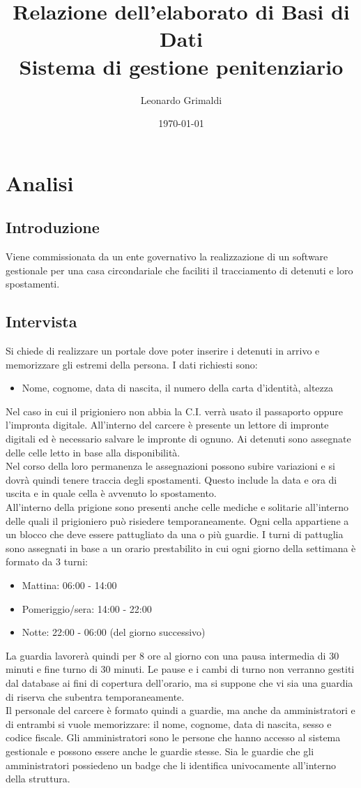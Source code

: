 \documentclass[a4paper,12pt]{report}
\title{Relazione dell'elaborato di Basi di Dati
    \\ Sistema di gestione penitenziario}
\author{Leonardo Grimaldi}
\date{\today}
\begin{document}
\maketitle
\tableofcontents
\chapter{Analisi}
\section{Introduzione}
Viene commissionata da un ente governativo la realizzazione di un software gestionale per una casa circondariale che faciliti il tracciamento di detenuti e loro spostamenti.
\section{Intervista}
Si chiede di realizzare un portale dove poter inserire i detenuti in arrivo e memorizzare gli estremi della persona.
%
I dati richiesti sono:
\begin{itemize}
    \item Nome, cognome, data di nascita, il numero della carta d'identità, altezza
\end{itemize}
Nel caso in cui il prigioniero non abbia la C.I. verrà usato il passaporto oppure l'impronta digitale.
%
All'interno del carcere è presente un lettore di impronte digitali ed è necessario salvare le impronte di ognuno.
%
Ai detenuti sono assegnate delle celle letto in base alla disponibilità.
%
\\Nel corso della loro permanenza le assegnazioni possono subire variazioni e si dovrà quindi tenere traccia degli spostamenti.
%
Questo include la data e ora di uscita e in quale cella è avvenuto lo spostamento.
%
\\All'interno della prigione sono presenti anche celle mediche e solitarie all'interno delle quali il prigioniero può risiedere temporaneamente.
%
Ogni cella appartiene a un blocco che deve essere pattugliato da una o più guardie.
%
I turni di pattuglia sono assegnati in base a un orario prestabilito in cui ogni giorno della settimana è formato da 3 turni:
\begin{itemize}
    \item Mattina: 06:00 - 14:00
    \item Pomeriggio/sera: 14:00 - 22:00
    \item Notte: 22:00 - 06:00 (del giorno successivo)
\end{itemize}
La guardia lavorerà quindi per 8 ore al giorno con una pausa intermedia di 30 minuti e fine turno di 30 minuti.
%
Le pause e i cambi di turno non verranno gestiti dal database ai fini di copertura dell'orario, ma si suppone che vi sia una guardia di riserva che subentra temporaneamente.
%
\\Il personale del carcere è formato quindi a guardie, ma anche da amministratori e di entrambi si vuole memorizzare: il nome, cognome, data di nascita, sesso e codice fiscale.
%
Gli amministratori sono le persone che hanno accesso al sistema gestionale e possono essere anche le guardie stesse.
%
Sia le guardie che gli amministratori possiedeno un badge che li identifica univocamente all'interno della struttura.
\end{document}
